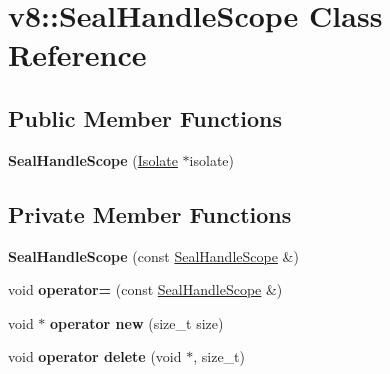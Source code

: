 \hypertarget{classv8_1_1_seal_handle_scope}{}\section{v8\+:\+:Seal\+Handle\+Scope Class Reference}
\label{classv8_1_1_seal_handle_scope}
\subsection*{Public Member Functions}
\begin{DoxyCompactItemize}
\item 
{\bfseries Seal\+Handle\+Scope} (\hyperlink{classv8_1_1_isolate}{Isolate} $\ast$isolate)\hypertarget{classv8_1_1_seal_handle_scope_acfdab75cc53b53d3ba1a50ab5f4fe16e}{}\label{classv8_1_1_seal_handle_scope_acfdab75cc53b53d3ba1a50ab5f4fe16e}

\end{DoxyCompactItemize}
\subsection*{Private Member Functions}
\begin{DoxyCompactItemize}
\item 
{\bfseries Seal\+Handle\+Scope} (const \hyperlink{classv8_1_1_seal_handle_scope}{Seal\+Handle\+Scope} \&)\hypertarget{classv8_1_1_seal_handle_scope_a20a6fe81d88f5f7743b1735552f8d17e}{}\label{classv8_1_1_seal_handle_scope_a20a6fe81d88f5f7743b1735552f8d17e}

\item 
void {\bfseries operator=} (const \hyperlink{classv8_1_1_seal_handle_scope}{Seal\+Handle\+Scope} \&)\hypertarget{classv8_1_1_seal_handle_scope_a75b5a0e5ce028332560a1330db9c90c7}{}\label{classv8_1_1_seal_handle_scope_a75b5a0e5ce028332560a1330db9c90c7}

\item 
void $\ast$ {\bfseries operator new} (size\+\_\+t size)\hypertarget{classv8_1_1_seal_handle_scope_a941ce2509193d4fc3a934d767753b135}{}\label{classv8_1_1_seal_handle_scope_a941ce2509193d4fc3a934d767753b135}

\item 
void {\bfseries operator delete} (void $\ast$, size\+\_\+t)\hypertarget{classv8_1_1_seal_handle_scope_a2eb35e15d4483b718d2c5a4f601eccf7}{}\label{classv8_1_1_seal_handle_scope_a2eb35e15d4483b718d2c5a4f601eccf7}

\end{DoxyCompactItemize}
